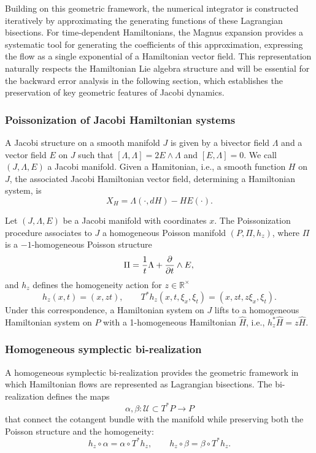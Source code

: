 \documentclass[12pt,english]{article}
\begin{document}
Building on this geometric framework, the numerical integrator is constructed iteratively by approximating the generating functions of these Lagrangian bisections. For time-dependent Hamiltonians, the Magnus expansion provides a systematic tool for generating the coefficients of this approximation, expressing the flow as a single exponential of a Hamiltonian vector field. This representation naturally respects the Hamiltonian Lie algebra structure and will be essential for the backward error analysis in the following section, which establishes the preservation of key geometric features of Jacobi dynamics.

\subsubsection{Poissonization of Jacobi Hamiltonian systems}
A Jacobi structure on a smooth manifold $J$ is given by a bivector field $\Lambda$ and a vector field $E$ on $J$ such that $[\Lambda, \Lambda] = 2 E \wedge \Lambda $ and $[E, \Lambda] = 0$. We call $(J,\Lambda,E)$ a Jacobi manifold. Given a Hamitonian, i.e., a smooth function $H$ on $J$, the associated Jacobi Hamiltonian vector field, determining a Hamiltonian system, is 
\begin{equation}\label{JH_vectorfield}
X_H = \Lambda(\cdot,dH) - H E(\cdot).
\end{equation}

Let $(J, \Lambda, E)$ be a Jacobi manifold with coordinates $x$. The Poissonization procedure \cite{LICHNEROWICZ1977} associates to $J$ a homogeneous Poisson manifold $(P, \Pi, h_z)$, where $\Pi$ is a $-1$-homogeneous Poisson structure 
\begin{equation}\label{poisson_structure}
\Pi = \frac{1}{t}\Lambda + \frac{\partial}{\partial t} \wedge E,\\
\end{equation}
and $h_z$ defines the homogeneity action for $z \in \mathbb{R}^\times$
\[
h_z(x,t) = (x, z t), \qquad T^*h_z(x,t,\xi_x,\xi_t) = (x, zt, z\xi_x, \xi_t).
\]
Under this correspondence, a Hamiltonian system on $J$ lifts to a homogeneous Hamiltonian system on $P$ with a 1-homogeneous Hamiltonian $\hat H$, i.e., $h_z^* \hat H = z \hat H$.

\subsubsection{Homogeneous symplectic bi-realization}

A homogeneous symplectic bi-realization provides the geometric framework in which Hamiltonian flows are represented as Lagrangian bisections. The bi-realization defines the maps
\[
\alpha, \beta: \mathcal{U}\subset T^*P \to P
\]
that connect the cotangent bundle with the manifold while preserving both the Poisson structure and the homogeneity:
\[
h_z \circ \alpha = \alpha \circ T^*h_z, \qquad h_z \circ \beta = \beta \circ T^*h_z.
\]
\end{document}
